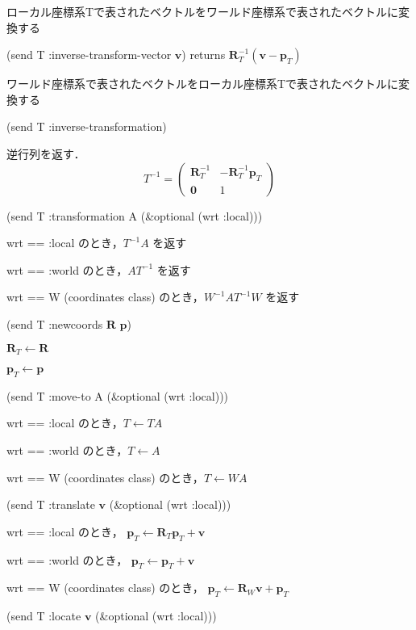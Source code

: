 ローカル座標系Tで表されたベクトルをワールド座標系で表されたベクトルに変換する

\noindent
(send T :inverse-transform-vector $\mathbf{v}$)
returns  $\mathbf{R}_T^{-1}\left( \mathbf{v} - \mathbf{p}_T \right)$

ワールド座標系で表されたベクトルをローカル座標系Tで表されたベクトルに変換する

\vspace{1ex}

\noindent
(send T :inverse-transformation)

逆行列を返す．\[
T^{-1} = \begin{pmatrix}
 \mathbf{R}_T^{-1} & -\mathbf{R}_T^{-1}\mathbf{p}_T \\
 \mathbf{0} & 1
\end{pmatrix}
\]

\noindent
(send T :transformation A (\&optional (wrt :local)))

wrt == :local のとき，$T^{-1}A$ を返す

wrt == :world のとき，$AT^{-1}$ を返す

wrt == W (coordinates class) のとき，$W^{-1}AT^{-1}W$ を返す


\vspace{1ex}

\noindent
(send T :newcoords $\mathbf{R}$ $\mathbf{p}$)

$\mathbf{R}_T \leftarrow \mathbf{R}$

$\mathbf{p}_T \leftarrow \mathbf{p}$

\noindent
(send T :move-to A (\&optional (wrt :local)))

wrt == :local のとき，$T \leftarrow TA$

wrt == :world のとき，$T \leftarrow A$

wrt == W (coordinates class) のとき，$T \leftarrow WA$

\noindent
(send T :translate $\mathbf{v}$ (\&optional (wrt :local)))

wrt == :local のとき，
$\mathbf{p}_{T} \leftarrow \mathbf{R}_{T}\mathbf{p}_{T} + \mathbf{v}$

wrt == :world のとき，
$\mathbf{p}_{T} \leftarrow \mathbf{p}_{T} + \mathbf{v}$

wrt == W (coordinates class) のとき，
$\mathbf{p}_{T} \leftarrow \mathbf{R}_{W} \mathbf{v} + \mathbf{p}_{T}$

\noindent
(send T :locate $\mathbf{v}$ (\&optional (wrt :local)))

